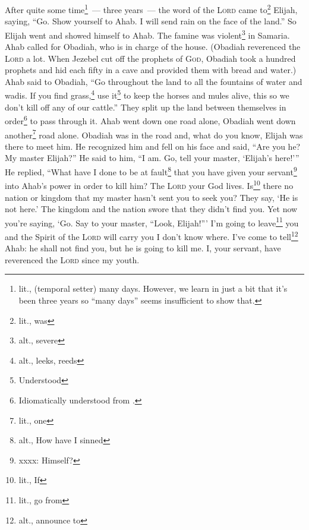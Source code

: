
\begin{inparaenum}
     After quite some time\footnote{lit., (temporal setter) many days. However, we learn in just a bit that it's been three years so ``many days'' seems insufficient to show that.}~--- three years~--- the word of the \textsc{Lord} came to\footnote{lit., was} Elijah, saying, ``Go. Show yourself to Ahab. I will send rain on the face of the land.''%
     So Elijah went and showed himself to Ahab. The famine was violent\footnote{alt., severe} in Samaria.%
     Ahab called for Obadiah, who is in charge of the house. (Obadiah reverenced the \textsc{Lord} a lot.%
     When Jezebel cut off the prophets of \textsc{God}, Obadiah took a hundred prophets and hid each fifty in a cave and provided them with bread and water.)%
     Ahab said to Obadiah, ``Go throughout the land to all the fountains of water and wadis. If you find grass,\footnote{alt., leeks, reeds} use it\footnote{Understood} to keep the horses and mules alive, this so we don't kill off any of our cattle.''%
     They split up the land between themselves in order\footnote{Idiomatically understood from .} to pass through it. Ahab went down one road alone, Obadiah went down another\footnote{lit., one} road alone.%
     Obadiah was in the road and, what do you know, Elijah was there to meet him. He recognized him and fell on his face and said, ``Are you he? My master Elijah?''%
     He said to him, ``I am. Go, tell your master, `Elijah's here!'\thinspace''%
     He replied, ``What have I done to be at fault\footnote{alt., How have I sinned} that you have given your servant\footnote{xxxx: Himself?} into Ahab's power in order to kill him?%
     The \textsc{Lord} your God lives. Is\footnote{lit., If} there no nation or kingdom that my master hasn't sent you to seek you? They say, `He is not here.' The kingdom and the nation swore that they didn't find you.%
     Yet now you're saying, `Go. Say to your master, ``Look, Elijah!''\thinspace'%
     I'm going to leave\footnote{lit., go from} you and the Spirit of the \textsc{Lord} will carry you I don't know where. I've come to tell\footnote{alt., announce to} Ahab: he shall not find you, but he is going to kill me. I, your servant, have reverenced the \textsc{Lord} since my youth.%

\end{inparaenum}
